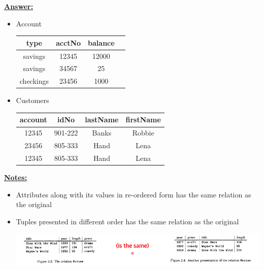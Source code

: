 \documentclass[12pt]{article}
\begin{document}
\begin{enumerate}[1.]
\begin{enumerate}[a)]
        \begin{mdframed}
            \underline{\textbf{Answer:}}

            \bigskip

            \begin{itemize}
                \item Account

                \begin{tabular}{|c|c|c|c|}
                    \hline
                    type & acctNo & balance\\
                    \hline
                    savings & 12345 & 12000\\
                    \hline
                    savings & 34567 & 25\\
                    \hline
                    checkings & 23456 & 1000\\
                    \hline
                \end{tabular}

                \item Customers

                \begin{tabular}{|c|c|c|c|}
                    \hline
                    account & idNo & lastName & firstName\\
                    \hline
                    12345 & 901-222 & Banks & Robbie\\
                    \hline
                    23456 & 805-333 & Hand & Lena\\
                    \hline
                    12345 & 805-333 & Hand & Lena\\
                    \hline
                \end{tabular}
            \end{itemize}
        \end{mdframed}

        \bigskip

        \underline{\textbf{Notes:}}

        \begin{itemize}
            \item Attributes along with its values in re-ordered form has the same relation as the original
            \item Tuples presented in different order has the same relation as the original

            \bigskip

            \begin{center}
            \includegraphics[width=\linewidth]{images/worksheet_1_solution_3.png}
            \end{center}
        \end{itemize}
    \end{enumerate}


\end{enumerate}
\end{document}
